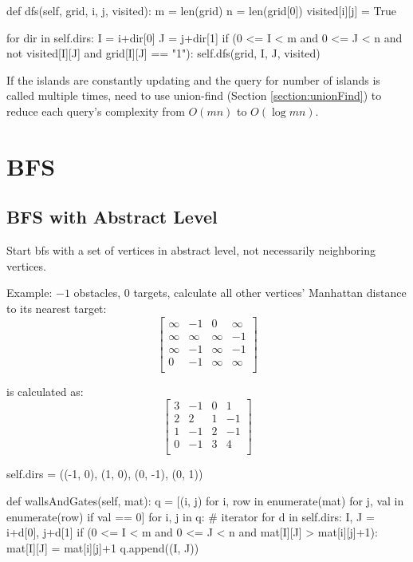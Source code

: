 \begin{python}
  def dfs(self, grid, i, j, visited):
    m = len(grid)
    n = len(grid[0])
    visited[i][j] = True

    for dir in self.dirs:
      I = i+dir[0]
      J = j+dir[1]
      if (0 <= I < m and 0 <= J < n and
        not visited[I][J] and grid[I][J] == "1"):
        self.dfs(grid, I, J, visited)
\end{python}
If the islands are constantly updating and the query for number of islands is called multiple times, need to use union-find (Section \ref{section:unionFind}) to reduce each query's complexity from $O(mn)$ to $O(\log mn)$.

\section{BFS}
\subsection{BFS with Abstract Level}
Start bfs with a set of vertices in abstract level, not necessarily neighboring vertices.

Example: $-1$ obstacles, $0$ targets, calculate all other vertices' Manhattan distance to its nearest target:
$$
\begin{bmatrix}
\infty & -1 & 0 & \infty \\
\infty & \infty & \infty & -1 \\
\infty & -1 & \infty & -1 \\
0 & -1 & \infty & \infty \\
\end{bmatrix}
$$

is calculated as:
$$
\begin{bmatrix}
3 & -1 & 0 & 1 \\
2 & 2 & 1 & -1 \\
1 & -1 & 2 & -1 \\
0 & -1 & 3 & 4 \\
\end{bmatrix}
$$
\newpage
{}
\begin{python}
self.dirs = ((-1, 0), (1, 0), (0, -1), (0, 1))

def wallsAndGates(self, mat):
  q = [(i, j) for i, row in enumerate(mat)
     for j, val in enumerate(row) if val == 0]
  for i, j in q:  # iterator
    for d in self.dirs:
      I, J = i+d[0], j+d[1]
      if (0 <= I < m and  0 <= J < n and
        mat[I][J] > mat[i][j]+1):
        mat[I][J] = mat[i][j]+1
        q.append((I, J))
\end{python}


